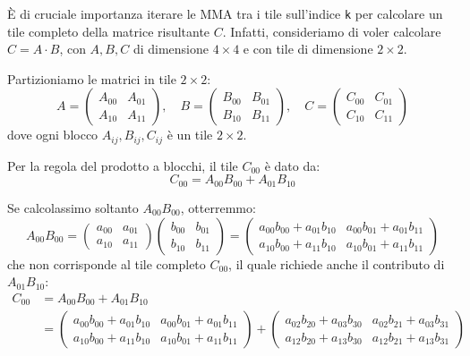 \begin{warning}{}
    È di cruciale importanza iterare le MMA tra i tile sull'indice \texttt{k} per calcolare un tile completo della matrice risultante \(C\).
    Infatti, consideriamo di voler calcolare \(C = A\cdot B\), con \(A, B, C\) di dimensione \(4 \times 4\) e con tile di dimensione \(2 \times 2\).
    
    Partizioniamo le matrici in tile \(2\times 2\):
    \[
    A = \begin{pmatrix}
    A_{00} & A_{01} \\
    A_{10} & A_{11}
    \end{pmatrix}, \quad
    B = \begin{pmatrix}
    B_{00} & B_{01} \\
    B_{10} & B_{11}
    \end{pmatrix}, \quad
    C = \begin{pmatrix}
    C_{00} & C_{01} \\
    C_{10} & C_{11}
    \end{pmatrix}
    \]
    dove ogni blocco \(A_{ij}, B_{ij}, C_{ij}\) è un tile \(2\times 2\).
    
    Per la regola del prodotto a blocchi, il tile \(C_{00}\) è dato da:
    \[
    C_{00} = A_{00}B_{00} + A_{01}B_{10}
    \]
    
    Se calcolassimo soltanto \(A_{00}B_{00}\), otterremmo:
    \[
    A_{00}B_{00} = \begin{pmatrix}
    a_{00} & a_{01} \\
    a_{10} & a_{11}
    \end{pmatrix}
    \begin{pmatrix}
    b_{00} & b_{01} \\
    b_{10} & b_{11}
    \end{pmatrix}
    =
    \begin{pmatrix}
    a_{00}b_{00} + a_{01}b_{10} & a_{00}b_{01} + a_{01}b_{11} \\
    a_{10}b_{00} + a_{11}b_{10} & a_{10}b_{01} + a_{11}b_{11}
    \end{pmatrix}
    \]
    che non corrisponde al tile completo \(C_{00}\), il quale richiede anche il contributo di \(A_{01}B_{10}\):
    \[
    \begin{aligned}
    C_{00} &= A_{00}B_{00} + A_{01}B_{10} \\
        &= 
    \begin{pmatrix}
    a_{00}b_{00} + a_{01}b_{10} & a_{00}b_{01} + a_{01}b_{11} \\
    a_{10}b_{00} + a_{11}b_{10} & a_{10}b_{01} + a_{11}b_{11}
    \end{pmatrix}
    +
    \begin{pmatrix}
    a_{02}b_{20} + a_{03}b_{30} & a_{02}b_{21} + a_{03}b_{31} \\
    a_{12}b_{20} + a_{13}b_{30} & a_{12}b_{21} + a_{13}b_{31}
    \end{pmatrix}
    \end{aligned}
    \]
    

\end{warning}
